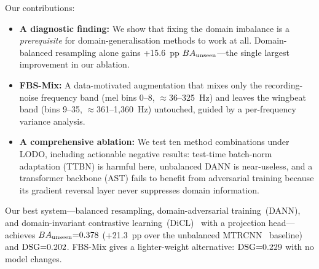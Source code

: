 Our contributions:
\begin{itemize}
  \item \textbf{A diagnostic finding:} We show that fixing the domain
    imbalance is a \emph{prerequisite} for domain-generalisation
    methods to work at all.
    Domain-balanced resampling alone gains +15.6~pp $BA_{\text{unseen}}$---the
    single largest improvement in our ablation.
  \item \textbf{FBS-Mix:} A data-motivated augmentation that mixes
    only the recording-noise frequency band
    (mel bins 0--8, $\approx$36--325~Hz) and leaves the wingbeat band
    (bins 9--35, $\approx$361--1{,}360~Hz) untouched, guided by a
    per-frequency variance analysis.
  \item \textbf{A comprehensive ablation:} We test ten method
    combinations under LODO, including actionable negative results:
    test-time batch-norm adaptation (TTBN) is harmful here, unbalanced
    DANN is near-useless, and a transformer backbone (AST) fails to
    benefit from adversarial training because its gradient reversal
    layer never suppresses domain information.
\end{itemize}

Our best system---balanced resampling, domain-adversarial
training~(DANN), and domain-invariant contrastive
learning~(DiCL)~\cite{drbiol2025} with a projection head---achieves
$BA_{\text{unseen}}{=}0.378$ (+21.3~pp over the unbalanced MTRCNN~\cite{mtrcnn2025}
baseline) and $\mathrm{DSG}{=}0.202$.
FBS-Mix gives a lighter-weight alternative: $\mathrm{DSG}{=}0.229$ with no
model changes.
